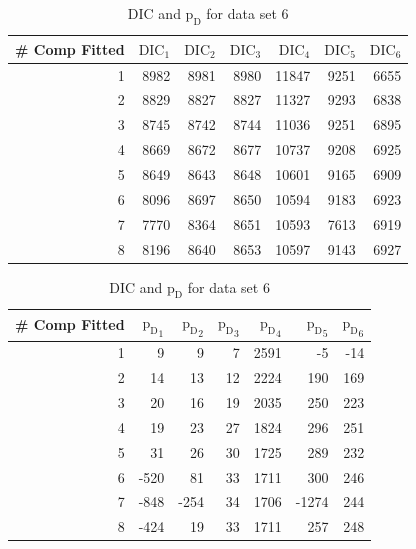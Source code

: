 \begin{table}[!htb]
\centering
\caption{DIC and $\text{p}_\text{D}$ for data set 6}
\label{table : ds_5wellsep_dic}
\begin{tabular}{@{}rrrrrrr@{}}
\toprule
\# Comp Fitted & $\text{DIC}_1$ & $\text{DIC}_2$  & $\text{DIC}_3$  & $\text{DIC}_4$  & $\text{DIC}_5$  & $\text{DIC}_6$  \\ \midrule
1 & 8982 & 8981 & 8980 & 11847 & 9251 & 6655 \\
2 & 8829 & 8827 & 8827 & 11327 & 9293 & 6838 \\
3 & 8745 & 8742 & 8744 & 11036 & 9251 & 6895 \\
4 & 8669 & 8672 & 8677 & 10737 & 9208 & 6925 \\
5 & 8649 & 8643 & 8648 & 10601 & 9165 & 6909 \\
6 & 8096 & 8697 & 8650 & 10594 & 9183 & 6923 \\
7 & 7770 & 8364 & 8651 & 10593 & 7613 & 6919 \\
8 & 8196 & 8640 & 8653 & 10597 & 9143 & 6927 \\ \bottomrule
\end{tabular}

\begin{tabular}{@{}rrrrrrr@{}}
\toprule
\# Comp Fitted & ${\text{p}_\text{D}}_1$ & ${\text{p}_\text{D}}_2$ & ${\text{p}_\text{D}}_3$ & ${\text{p}_\text{D}}_4$ & ${\text{p}_\text{D}}_5$ & ${\text{p}_\text{D}}_6$ \\ \midrule
1 & 9 & 9 & 7 & 2591 & -5 & -14 \\
2 & 14 & 13 & 12 & 2224 & 190 & 169 \\
3 & 20 & 16 & 19 & 2035 & 250 & 223 \\
4 & 19 & 23 & 27 & 1824 & 296 & 251 \\
5 & 31 & 26 & 30 & 1725 & 289 & 232 \\
6 & -520 & 81 & 33 & 1711 & 300 & 246 \\
7 & -848 & -254 & 34 & 1706 & -1274 & 244 \\
8 & -424 & 19 & 33 & 1711 & 257 & 248 \\ \bottomrule
\end{tabular}
\end{table}

